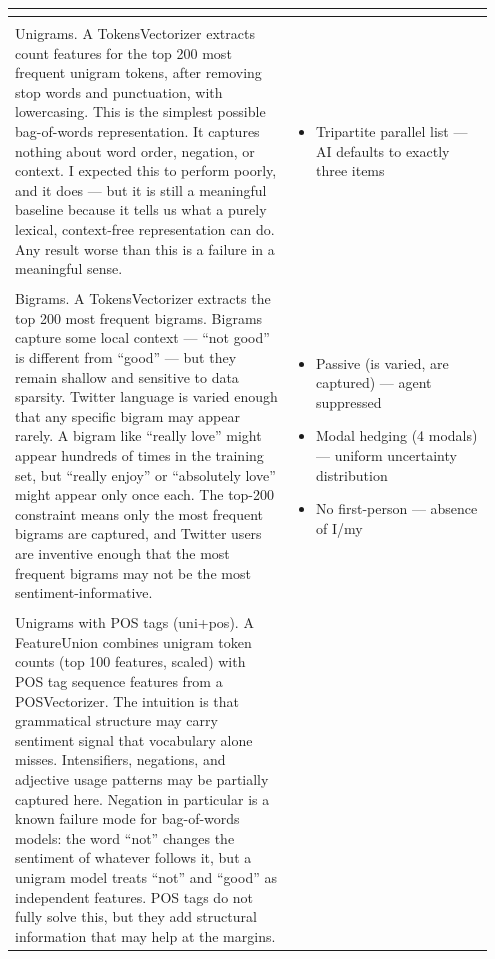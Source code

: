 \documentclass[11pt]{article}
\begin{document}
\begin{longtable}{|p{0.55\linewidth}|p{0.40\linewidth}|}
\begin{itemize}[leftmargin=1em,itemsep=1pt,topsep=1pt,parsep=0pt]
\end{itemize} \\[2pt]
\hline
\rule{0pt}{3.5cm} & \\
\hline
Unigrams. A TokensVectorizer extracts count features for the top 200 most frequent unigram tokens, after removing stop words and punctuation, with lowercasing. This is the simplest possible bag-of-words representation. It captures nothing about word order, negation, or context. I expected this to perform poorly, and it does --- but it is still a meaningful baseline because it tells us what a purely lexical, context-free representation can do. Any result worse than this is a failure in a meaningful sense. & \begin{itemize}[leftmargin=1em,itemsep=1pt,topsep=1pt,parsep=0pt]
  \item Tripartite parallel list --- AI defaults to exactly three items
\end{itemize} \\[2pt]
\hline
\rule{0pt}{3.5cm} & \\
\hline
Bigrams. A TokensVectorizer extracts the top 200 most frequent bigrams. Bigrams capture some local context --- ``not good'' is different from ``good'' --- but they remain shallow and sensitive to data sparsity. Twitter language is varied enough that any specific bigram may appear rarely. A bigram like ``really love'' might appear hundreds of times in the training set, but ``really enjoy'' or ``absolutely love'' might appear only once each. The top-200 constraint means only the most frequent bigrams are captured, and Twitter users are inventive enough that the most frequent bigrams may not be the most sentiment-informative. & \begin{itemize}[leftmargin=1em,itemsep=1pt,topsep=1pt,parsep=0pt]
  \item Passive (is varied, are captured) --- agent suppressed
  \item Modal hedging (4 modals) --- uniform uncertainty distribution
  \item No first-person --- absence of I/my
\end{itemize} \\[2pt]
\hline
\rule{0pt}{3.5cm} & \\
\hline
Unigrams with POS tags (uni+pos). A FeatureUnion combines unigram token counts (top 100 features, scaled) with POS tag sequence features from a POSVectorizer. The intuition is that grammatical structure may carry sentiment signal that vocabulary alone misses. Intensifiers, negations, and adjective usage patterns may be partially captured here. Negation in particular is a known failure mode for bag-of-words models: the word ``not'' changes the sentiment of whatever follows it, but a unigram model treats ``not'' and ``good'' as independent features. POS tags do not fully solve this, but they add structural information that may help at the margins. & \begin{itemize}[leftmargin=1em,itemsep=1pt,topsep=1pt,parsep=0pt]

\end{itemize}
\end{longtable}
\end{document}
